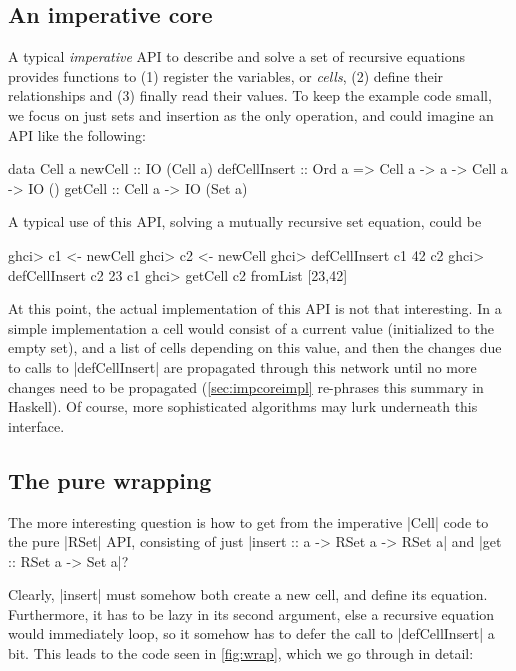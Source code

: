 \documentclass[manuscript,anonymous,screen,acmsmall]{acmart}
\begin{document}
\subsection{An imperative core}\label{sec:impcore}

A typical \emph{imperative} API to describe and solve a set of recursive equations provides functions to (1) register the variables, or \emph{cells}, (2) define their relationships and (3) finally read their values. To keep the example code small, we focus on just sets and insertion as the only operation, and could imagine an API like the following:

\begin{minipage}{\linewidth}
\begin{code}
data Cell a
newCell        ::                                      IO (Cell a)
defCellInsert  ::  Ord a =>  Cell a -> a -> Cell a ->  IO ()
getCell        ::            Cell a ->                 IO (Set a)
\end{code}
\end{minipage}

A typical use of this API, solving a mutually recursive set equation, could be
\begin{code}
ghci> c1 <- newCell
ghci> c2 <- newCell
ghci> defCellInsert c1 42 c2
ghci> defCellInsert c2 23 c1
ghci> getCell c2
fromList [23,42]
\end{code}

At this point, the actual implementation of this API is not that interesting. In a simple implementation a cell would consist of a current value (initialized to the empty set), and a list of cells depending on this value, and then the changes due to calls to |defCellInsert| are propagated through this network until no more changes need to be propagated (\cref{sec:impcoreimpl} re-phrases this summary in Haskell). Of course, more sophisticated algorithms may lurk underneath this interface.

\subsection{The pure wrapping}

The more interesting question is how to get from the imperative |Cell| code to the pure |RSet| API, consisting of just |insert :: a -> RSet a -> RSet a| and |get :: RSet a -> Set a|?

Clearly, |insert| must somehow both create a new cell, and define its equation.
Furthermore, it has to be lazy in its second argument, else a recursive equation would immediately loop, so it somehow has to defer the call to |defCellInsert| a bit. This leads to the code seen in \cref{fig:wrap}, which we go through in detail:
\end{document}
